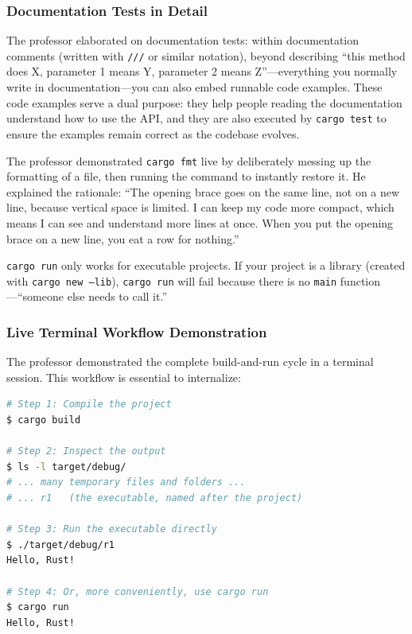 \subsubsection{Documentation Tests in Detail}

The professor elaborated on documentation tests: within documentation comments (written with \texttt{///} or similar notation), beyond describing ``this method does X, parameter 1 means Y, parameter 2 means Z''---everything you normally write in documentation---you can also embed runnable code examples. These code examples serve a dual purpose: they help people reading the documentation understand how to use the API, and they are also executed by \texttt{cargo test} to ensure the examples remain correct as the codebase evolves.

\begin{insightbox}
The professor demonstrated \texttt{cargo fmt} live by deliberately messing up the formatting of a file, then running the command to instantly restore it. He explained the rationale: ``The opening brace goes on the same line, not on a new line, because vertical space is limited. I can keep my code more compact, which means I can see and understand more lines at once. When you put the opening brace on a new line, you eat a row for nothing.''
\end{insightbox}

\begin{warningbox}
\texttt{cargo run} only works for executable projects. If your project is a library (created with \texttt{cargo new --lib}), \texttt{cargo run} will fail because there is no \texttt{main} function---``someone else needs to call it.''
\end{warningbox}

\subsubsection{Live Terminal Workflow Demonstration}

The professor demonstrated the complete build-and-run cycle in a terminal session. This workflow is essential to internalize:

\begin{lstlisting}[language=bash]
# Step 1: Compile the project
$ cargo build

# Step 2: Inspect the output
$ ls -l target/debug/
# ... many temporary files and folders ...
# ... r1   (the executable, named after the project)

# Step 3: Run the executable directly
$ ./target/debug/r1
Hello, Rust!

# Step 4: Or, more conveniently, use cargo run
$ cargo run
Hello, Rust!
\end{lstlisting}

